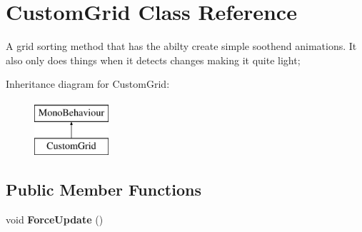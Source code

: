 \hypertarget{class_custom_grid}{}\section{Custom\+Grid Class Reference}
\label{class_custom_grid}


A grid sorting method that has the abilty create simple soothend animations. It also only does things when it detects changes making it quite light;  


Inheritance diagram for Custom\+Grid\+:\begin{figure}[H]
\begin{center}
\leavevmode
\includegraphics[height=2.000000cm]{class_custom_grid}
\end{center}
\end{figure}
\subsection*{Public Member Functions}
\begin{DoxyCompactItemize}
\item 
void {\bfseries Force\+Update} ()\hypertarget{class_custom_grid_a1b2b4541146de94aaead99bca2f78d7f}{}\label{class_custom_grid_a1b2b4541146de94aaead99bca2f78d7f}

\end{DoxyCompactItemize}
